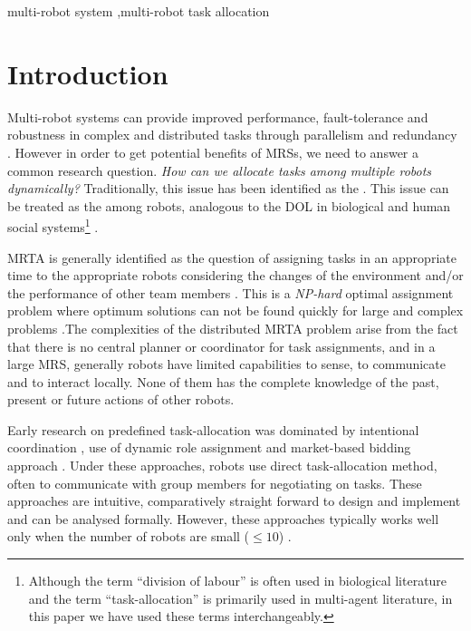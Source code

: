 \documentclass[preprint,12pt]{elsarticle}
\begin{document}
\begin{frontmatter}
\begin{abstract}
\end{abstract}
\begin{keyword}
multi-robot system \sep multi-robot task allocation
\end{keyword}
\end{frontmatter}
\section{Introduction}
\label{sec:intro}
 Multi-robot systems can provide improved performance, fault-tolerance and robustness in complex and distributed tasks through parallelism and redundancy \cite{Arkin1998,Parker+2006}. However in order to get potential benefits of \aclp{MRS}, we need to answer a common research question. \textit{How can we allocate tasks among multiple robots dynamically?} Traditionally, this issue has been identified as the  \cite{Gerkey+2004}. This issue can be treated as the  among robots, analogous to the DOL in biological and human social systems\footnote{Although the term ``division of labour'' is often used in biological literature and the term ``task-allocation'' is primarily used in multi-agent literature,  in this paper we have used these terms interchangeably.} \cite{Sendova-Franks+1999}.

MRTA is generally identified as the question of assigning tasks in an appropriate time to the appropriate robots considering the changes of the environment and/or the performance of other team members \cite{Gerkey+2003}. This is a {\em NP-hard} optimal assignment problem where optimum solutions can not be found quickly for large and complex problems \cite{Parker2008}.The complexities of the distributed MRTA problem arise from the fact that there is no central planner or coordinator for task assignments, and in a large \acl{MRS}, generally robots have limited capabilities to sense, to communicate and to interact locally. None of them has the complete knowledge of the past, present or future actions of other robots.

Early research on predefined task-allocation was dominated by intentional coordination \cite{Parker2008}, use of dynamic role assignment \cite{Chaimowicz2002} and market-based bidding approach \cite{Dias+2006}. Under these approaches, robots use direct task-allocation method, often to communicate with group members for negotiating on tasks. These approaches are intuitive, comparatively straight forward to design and implement and can be analysed formally. However, these approaches typically works well only when the number of robots are small ($\leq 10$) \cite{Lerman+2006}.
\end{document}

